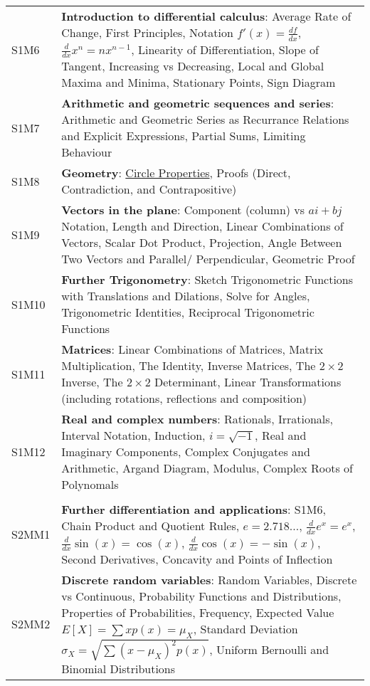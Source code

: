 \documentclass[varwidth=144mm, 12pt]{standalone}
\begin{document}
\begin{longtable}{lp{}}
S1M6 & \textbf{Introduction to differential calculus}: Average Rate of Change, First Principles, Notation $f'(x) = \frac{df}{dx}$, $\frac{d}{dx}x^n = nx^{n-1}$, Linearity of Differentiation, Slope of Tangent, Increasing vs Decreasing, Local and Global Maxima and Minima, Stationary Points, Sign Diagram \\
S1M7 & \textbf{Arithmetic and geometric sequences and series}: Arithmetic and Geometric Series as Recurrance Relations and Explicit Expressions, Partial Sums, Limiting Behaviour  \\
S1M8 & \textbf{Geometry}: \href{https://prezi.com/view/vpmCHdeFbIV2xlYHhZiK}{Circle Properties}, Proofs (Direct, Contradiction, and Contrapositive) \\
S1M9 & \textbf{Vectors in the plane}: Component (column) vs $ai + bj$ Notation, Length and Direction, Linear Combinations of Vectors, Scalar Dot Product, Projection, Angle Between Two Vectors and Parallel/ Perpendicular, Geometric Proof \\
S1M10 & \textbf{Further Trigonometry}: Sketch Trigonometric Functions with Translations and Dilations, Solve for Angles, Trigonometric Identities, Reciprocal Trigonometric Functions\\
S1M11 & \textbf{Matrices}: Linear Combinations of Matrices, Matrix Multiplication, The Identity, Inverse Matrices, The $2 \times 2$ Inverse, The $2 \times 2$ Determinant, Linear Transformations (including rotations, reflections and composition) \\
S1M12 & \textbf{Real and complex numbers}: Rationals, Irrationals, Interval Notation, Induction, $i = \sqrt{-1}$, Real and Imaginary Components, Complex Conjugates and Arithmetic, Argand Diagram, Modulus, Complex Roots of Polynomals \\
& \\
S2MM1 & \textbf{Further differentiation and applications}: S1M6, Chain Product and Quotient Rules, $e = 2.718\hdots$, $\frac{d}{dx}e^x = e^x$,  $\frac{d}{dx}\sin(x) = \cos(x)$, $\frac{d}{dx}\cos(x) = -\sin(x)$, Second Derivatives, Concavity and Points of Inflection \\
S2MM2 & \textbf{Discrete random variables}: Random Variables, Discrete vs Continuous, Probability Functions and Distributions, Properties of Probabilities, Frequency, Expected Value $E[X] = \sum{xp(x)} = \mu_X$, Standard Deviation $\sigma_X = \sqrt{\sum{(x-\mu_X)^2p(x)}}$, Uniform Bernoulli and Binomial Distributions \\

\end{longtable}
\end{document}
